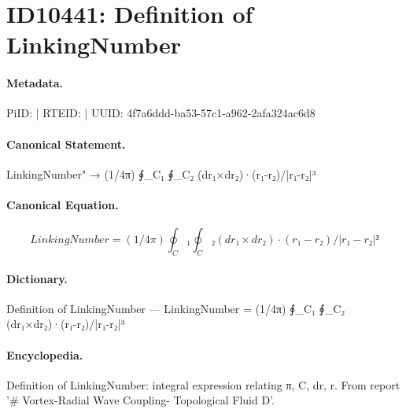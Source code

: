 \section*{ID10441: Definition of LinkingNumber}
\paragraph{Metadata.}
PiID:  | RTEID:  | UUID: 4f7a6ddd-ba53-57c1-a962-2afa324ac6d8

\paragraph{Canonical Statement.}
LinkingNumber" → (1/4π) ∮\_C₁ ∮\_C₂ (dr₁×dr₂)·(r₁-r₂)/|r₁-r₂|³

\paragraph{Canonical Equation.}
\[
LinkingNumber = (1/4π) ∮_C₁ ∮_C₂ (dr₁×dr₂)·(r₁-r₂)/|r₁-r₂|³
\]

\paragraph{Dictionary.}
Definition of LinkingNumber — LinkingNumber = (1/4π) ∮\_C₁ ∮\_C₂ (dr₁×dr₂)·(r₁-r₂)/|r₁-r₂|³

\paragraph{Encyclopedia.}
Definition of LinkingNumber: integral expression relating π, C, dr, r. From report '\# Vortex-Radial Wave Coupling- Topological Fluid D'.
